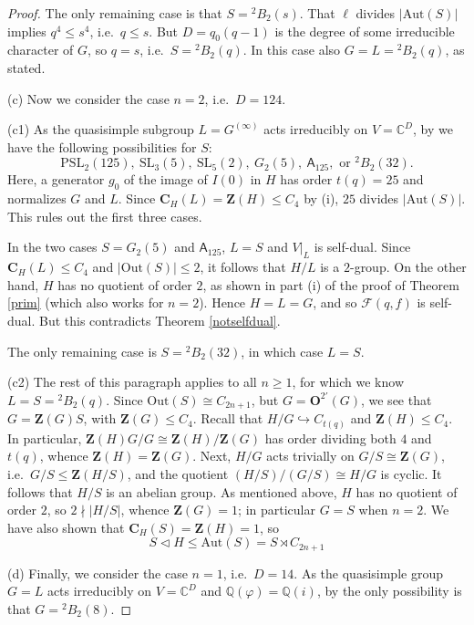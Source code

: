 \documentclass[11pt]{amsart}
\theoremstyle{plain}
\theoremstyle{definition}
\numberwithin{thm}{section}
\numberwithin{equation}{thm}
\newcommand{\inj}{\hookrightarrow}
\newcommand{\Aut}{\mathrm{Aut}}
\newcommand{\Out}{\mathrm{Out}}
\newcommand{\SL}{\mathrm{SL}}
\newcommand{\PSL}{\mathrm{PSL}}
\newcommand{\sF}{{\mathcal F}}
\newcommand{\C}{{\mathbb C}}
\newcommand{\Q}{{\mathbb Q}}
\newcommand{\0}{\emptyset}
\newcommand{\ZB}{{\mathbf Z}}
\newcommand{\CB}{{\mathbf C}}
\newcommand{\OB}{{\mathbf O}}
\newcommand{\ABS}{\mathsf{A}}
\newcommand{\tw}[1]{{}^#1\!}
\begin{document}
\begin{proof}
The only remaining case is that $S = \tw2 B_2(s)$. That $\ell$ divides
$|\Aut(S)|$ implies $q^4 \leq s^4$, i.e.\ $q\leq s$.  But 
$D=q_0(q-1)$ is the degree of some irreducible character of $G$, so $q=s$, i.e.\ $S = \tw2 B_2(q)$. In this
case also $G=L=\tw2 B_2(q)$, as stated.

\smallskip
(c) Now we consider the case $n=2$, i.e.\ $D = 124$. 

\smallskip
(c1) As the quasisimple subgroup $L=G^{(\infty)}$ acts irreducibly on
$V=\C^D$, by \cite{HM} we have the following possibilities for $S$: 
$$\PSL_2(125),~\SL_3(5),~\SL_5(2),~G_2(5),~\ABS_{125}, \mbox{ or }\tw2 B_2(32).$$ 
Here, a generator $g_0$ of the image of $I(0)$ in $H$ has order $t(q)=25$
and normalizes $G$ and $L$. Since $\CB_H(L) = \ZB(H) \leq C_4$ by (i), $25$ divides $|\Aut(S)|$. This rules out
the first three cases. 

In the two cases $S = G_2(5)$ and $\ABS_{125}$, $L=S$ and $V|_L$ is self-dual. Since $\CB_H(L) \leq C_4$ and 
$|\Out(S)| \leq 2$, it follows that $H/L$ is a $2$-group. On the other hand, $H$ has no quotient of order $2$, as shown 
in part (i) of the proof of Theorem \ref{prim} (which also works for $n=2$). 
Hence
$H=L=G$, and so $\sF(q,f)$ is self-dual. But this contradicts Theorem \ref{notselfdual}.

The only remaining case is $S=\tw2 B_2(32)$, in which case $L=S$. 

\smallskip
(c2) The rest of this paragraph applies to all $n \geq 1$, for which we know $L=S=\tw2 B_2(q)$. Since 
$\Out(S) \cong C_{2n+1}$, but $G = \OB^{2'}(G)$, we see that $G=\ZB(G)S$, with $\ZB(G) \leq C_4$. Recall that 
$H/G \inj C_{t(q)}$ and $\ZB(H) \leq C_4$. In particular, $\ZB(H)G/G \cong \ZB(H)/\ZB(G)$ has order dividing both $4$ and $t(q)$, whence
$\ZB(H)=\ZB(G)$. Next, $H/G$ acts trivially on $G/S \cong \ZB(G)$, i.e.\ $G/S \leq \ZB(H/S)$, and the quotient
$(H/S)/(G/S) \cong H/G$ is cyclic. It follows that $H/S$ is an abelian group. As mentioned above, $H$ has no quotient
of order $2$, so $2 \nmid |H/S|$, whence $\ZB(G)=1$; in particular $G=S$ when $n=2$. We have also shown
that $\CB_H(S)=\ZB(H)=1$, so 
\begin{equation}\label{div12}
  S \lhd H \leq \Aut(S) = S \rtimes C_{2n+1}
\end{equation}

\smallskip
(d) Finally, we consider the case $n=1$, i.e.\ $D = 14$. As the quasisimple group $G=L$ acts irreducibly on
$V=\C^D$ and $\Q(\varphi) = \Q(i)$, by \cite{HM} 
the only possibility is that
$G=\tw2 B_2(8)$.
\end{proof}
\end{document}
